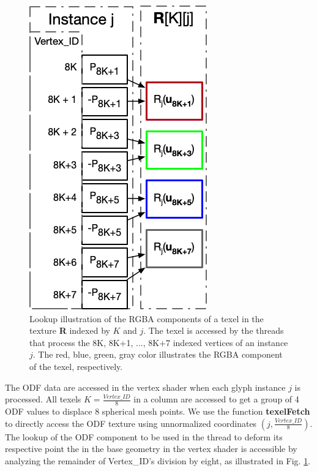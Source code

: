 \documentclass[twoside,twocolumn,10pt]{article}
\begin{document}
\begin{figure}[ht]
    \centering
    \includegraphics[width=0.7\linewidth, angle=0]{figs/rendering_scheme/texellookup.png}
    \caption{Lookup illustration of the RGBA components of a texel in the texture \textbf{R} indexed by $K$ and $j$. The texel is accessed by the threads that process the 8K, 8K+1, ..., 8K+7 indexed vertices of an instance $j$. The red, blue, green, gray color illustrates the RGBA component of the texel, respectively.}
    \label{fig::texelfetch}
\end{figure}

 
 The ODF data are accessed in the vertex shader when each glyph instance $j$ is processed. All texels $K = \frac{Vertex\_ID}{8}$ in a column are accessed to get a group of 4 ODF values to displace 8 spherical mesh points. We use the function {\bf texelFetch} to directly access the ODF texture using unnormalized coordinates $(j, \frac{Vertex\_ID}{8})$. The lookup of the ODF component to be used in the thread to deform its respective point the in the base geometry in the vertex shader is accessible by analyzing the remainder of Vertex\_ID's division by eight, as illustrated in Fig. \ref{fig::texelfetch}.
\end{document}
